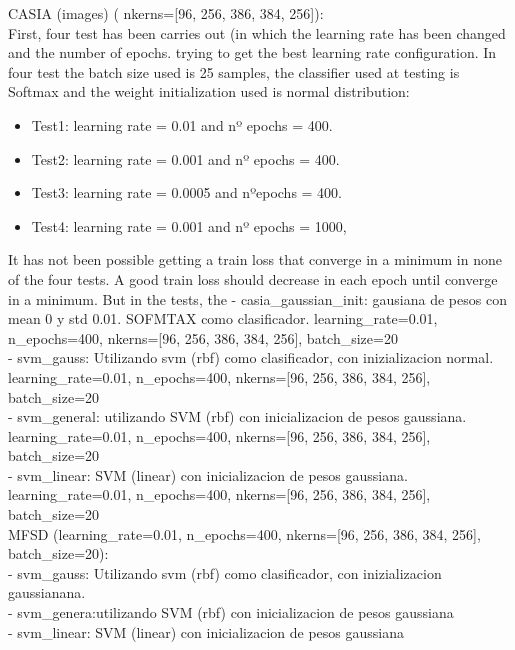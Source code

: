 CASIA (images) ( nkerns=[96, 256, 386, 384, 256]):\\
First, four test has been carries out (in which the learning rate has been changed and the number of epochs. trying to get the best learning rate configuration. In four test the batch size used is 25 samples, the classifier used at testing is Softmax and the weight initialization used is normal distribution:

\begin{itemize} [noitemsep,topsep=8pt,parsep=0pt,partopsep=20pt]
\item Test1: learning rate = 0.01 and nº epochs = 400.
\item Test2: learning rate = 0.001 and nº epochs = 400.
\item Test3: learning rate = 0.0005 and nºepochs = 400.
\item Test4: learning rate = 0.001 and nº epochs = 1000,
\end{itemize}

It has not been possible getting a train loss that converge in a minimum in none of the four tests. A good train loss should decrease in each epoch until converge in a minimum. But in the tests, the
- casia\_gaussian\_init: gausiana de pesos con mean 0 y std 0.01. SOFMTAX como clasificador. learning\_rate=0.01, n\_epochs=400, nkerns=[96, 256, 386, 384, 256], batch\_size=20 \\
- svm\_gauss: Utilizando svm (rbf) como clasificador, con inizializacion normal. learning\_rate=0.01, n\_epochs=400, nkerns=[96, 256, 386, 384, 256], batch\_size=20\\
- svm\_general: utilizando SVM (rbf) con inicializacion de pesos gaussiana. learning\_rate=0.01, n\_epochs=400, nkerns=[96, 256, 386, 384, 256], batch\_size=20\\
- svm\_linear: SVM (linear) con inicializacion de pesos gaussiana. learning\_rate=0.01, n\_epochs=400, nkerns=[96, 256, 386, 384, 256], batch\_size=20\\

MFSD  (learning\_rate=0.01, n\_epochs=400, nkerns=[96, 256, 386, 384, 256], batch\_size=20):\\
- svm\_gauss: Utilizando svm (rbf) como clasificador, con inizializacion gaussianana.\\
- svm\_genera:utilizando SVM (rbf) con inicializacion de pesos gaussiana \\
- svm\_linear: SVM (linear) con inicializacion de pesos gaussiana\\

